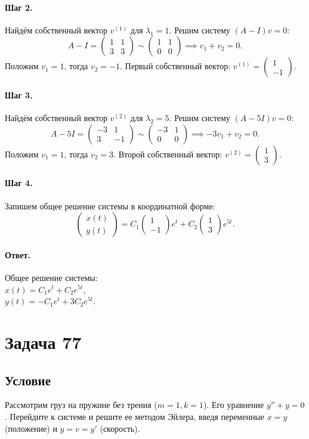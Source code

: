 \documentclass[12pt,a4paper]{article}
\theoremstyle{solution}
\newcommand{\task}[1]{\newpage\section*{Задача #1}}
\newcommand{\answer}{\paragraph{Ответ.}}
\newcommand{\step}[1]{\paragraph{Шаг #1.}}
\begin{document}
\step{2} Найдём собственный вектор $v^{(1)}$ для $\lambda_1 = 1$. Решим систему $(A - I)v = 0$:
\[
A - I = \begin{pmatrix} 1 & 1 \\ 3 & 3 \end{pmatrix} \sim \begin{pmatrix} 1 & 1 \\ 0 & 0 \end{pmatrix} \implies v_1 + v_2 = 0.
\]
Положим $v_1 = 1$, тогда $v_2 = -1$. Первый собственный вектор: $v^{(1)} = \begin{pmatrix} 1 \\ -1 \end{pmatrix}$.

\step{3} Найдём собственный вектор $v^{(2)}$ для $\lambda_2 = 5$. Решим систему $(A - 5I)v = 0$:
\[
A - 5I = \begin{pmatrix} -3 & 1 \\ 3 & -1 \end{pmatrix} \sim \begin{pmatrix} -3 & 1 \\ 0 & 0 \end{pmatrix} \implies -3v_1 + v_2 = 0.
\]
Положим $v_1 = 1$, тогда $v_2 = 3$. Второй собственный вектор: $v^{(2)} = \begin{pmatrix} 1 \\ 3 \end{pmatrix}$.

\step{4} Запишем общее решение системы в координатной форме:
\[
\begin{pmatrix} x(t) \\ y(t) \end{pmatrix} = C_1 \begin{pmatrix} 1 \\ -1 \end{pmatrix} e^t + C_2 \begin{pmatrix} 1 \\ 3 \end{pmatrix} e^{5t}.
\]

\answer
Общее решение системы: \\
$x(t) = C_1 e^t + C_2 e^{5t}$, \\
$y(t) = -C_1 e^t + 3C_2 e^{5t}$.

\task{77}
\subsection*{Условие}
Рассмотрим груз на пружине без трения ($m = 1, k = 1$). Его уравнение $y'' + y = 0$. Перейдите к системе и решите ее методом Эйлера, введя переменные $x = y$ (положение) и $y = v = y'$ (скорость).
\end{document}
